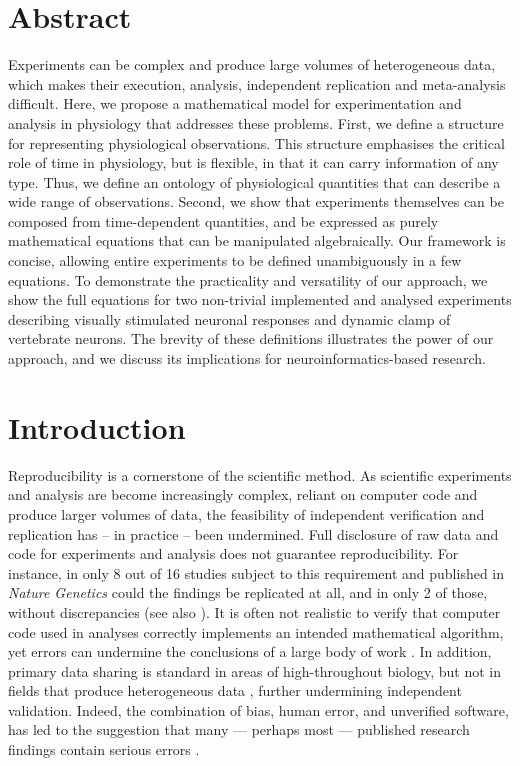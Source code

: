 
\section*{Abstract}

Experiments can be complex and produce large volumes of heterogeneous
data, which makes their execution, analysis, independent replication
and meta-analysis difficult. Here, we propose a mathematical model for
experimentation and analysis in physiology that addresses these
problems. First, we define a structure for representing physiological
observations. This structure emphasises the critical role of time in
physiology, but is flexible, in that it can carry information of any
type. Thus, we define an ontology of physiological quantities that can
describe a wide range of observations. Second, we show that
experiments themselves can be composed from time-dependent quantities,
and be expressed as purely mathematical equations that can be
manipulated algebraically. Our framework is concise, allowing entire
experiments to be defined unambiguously in a few equations. To
demonstrate the practicality and versatility of our approach, we show
the full equations for two non-trivial implemented and analysed
experiments describing visually stimulated neuronal responses and
dynamic clamp of vertebrate neurons. The brevity of these definitions
illustrates the power of our approach, and we discuss its implications
for neuroinformatics-based research.

\pagebreak

\section*{Introduction}

Reproducibility is a cornerstone of the scientific method. As
scientific experiments and analysis are become increasingly complex,
reliant on computer code and produce larger volumes of data, the
feasibility of independent verification and replication has -- in
practice -- been undermined. Full disclosure of raw data and code for
experiments and analysis does not guarantee reproducibility.  For
instance, in only 8 out of 16 studies subject to this requirement and
published in \emph{Nature Genetics} could the findings be replicated
at all, and in only 2 of those, without discrepancies
\citep{Ioannidis2008} (see also \citep{Baggerly2009,
  McCullough2007}). It is often not realistic to verify that computer
code used in analyses correctly implements an intended mathematical
algorithm, yet errors can undermine the conclusions of a
large body of work \citep{Chang2006}.  In addition, primary data
sharing is standard in areas of high-throughout biology, but
not in fields that produce heterogeneous data \citep{Gardner2005},
further undermining independent validation.  Indeed, the combination
of bias, human error, and unverified software, has led to the
suggestion that many --- perhaps most --- published research findings
contain serious errors \citep{Ioannidis2005, Merali2010}.

